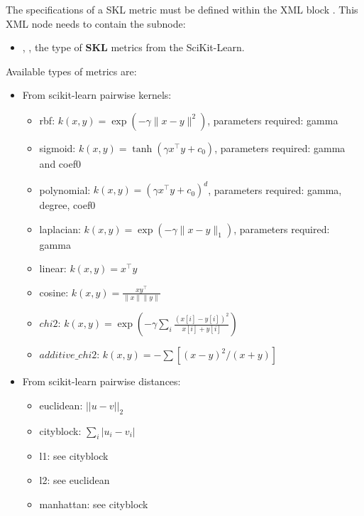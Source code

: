 The specifications of a SKL metric must be defined within the XML block .
This XML node needs to contain the subnode:
\begin{itemize}
  \item {}, , the type of \textbf{SKL} metrics from the SciKit-Learn.
\end{itemize}

Available types of metrics are:
\begin{itemize}  
  \item   From scikit-learn pairwise kernels:
    \begin{itemize}
       \item rbf: $k(x, y) = \exp( -\gamma \| x-y \|^2)$, parameters required: gamma  
       \item sigmoid: $k(x, y) = \tanh( \gamma x^\top y + c_0)$, parameters required: gamma and coef0 
       \item polynomial: $k(x, y) = (\gamma x^\top y +c_0)^d$, parameters required: gamma, degree, coef0
       \item laplacian: $k(x, y) = \exp( -\gamma \| x-y \|_1)$, parameters required: gamma 
       \item linear: $k(x, y) = x^\top y$ 
       \item cosine: $k(x, y) = \frac{x y^\top}{\|x\| \|y\|}$
       \item $chi2$: $k(x, y) = \exp \left (-\gamma \sum_i \frac{(x[i] - y[i]) ^ 2}{x[i] + y[i]} \right )$ 
       \item $additive\_chi2$: $k(x, y) = -\sum [(x - y)^2 / (x + y)]$
    \end{itemize}
  
  \item   From scikit-learn pairwise distances:
    \begin{itemize}
      \item euclidean: ${||u-v||}_2$
      \item cityblock: $\sum_i {\left| u_i - v_i \right|}$
      \item l1: see cityblock
      \item l2: see euclidean
      \item manhattan: see cityblock
    \end{itemize}


\end{itemize}
